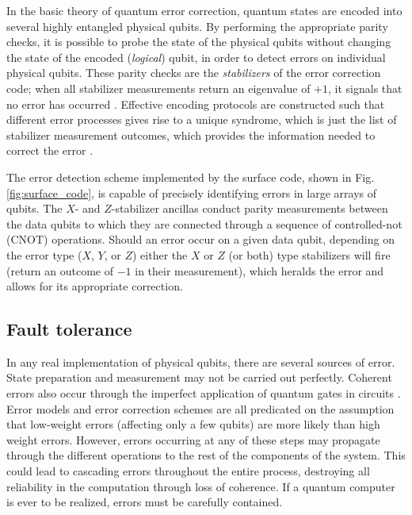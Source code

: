 In the basic theory of quantum error correction, quantum states are encoded into
several highly entangled physical qubits. By performing the appropriate parity
checks, it is possible to probe the state of the physical qubits without
changing the state of the encoded (\textit{logical}) qubit, in order to detect
errors on individual physical qubits. These parity checks are the
\textit{stabilizers} of the error correction code; when all stabilizer
measurements return an eigenvalue of $+1$, it signals that no error has occurred
\cite{nielsen_chuang_2010}. Effective encoding protocols are constructed such
that different error processes gives rise to a unique syndrome, which is just the
list of stabilizer measurement outcomes, which provides the information needed
to correct the error \cite{fowler12_surfac_codes}.

The error detection scheme implemented by the surface code, shown in Fig.
\ref{fig:surface_code}, is capable of precisely identifying errors in large
arrays of qubits. The $X$- and $Z$-stabilizer ancillas conduct parity
measurements between the data qubits to which they are connected through a
sequence of controlled-not (CNOT) operations. Should an error occur on a given
data qubit, depending on the error type ($X$, $Y$, or $Z$) either the $X$ or $Z$
(or both) type stabilizers will fire (return an outcome of $-1$ in their
measurement), which heralds the error and allows for its appropriate correction.

\subsection{Fault tolerance}
In any real implementation of physical qubits, there are several sources of
error. State preparation and measurement may not be carried out perfectly.
Coherent errors also occur through the imperfect application of quantum gates in
circuits \cite{Devitt_2013}. Error models and error correction schemes are all
predicated on the assumption that low-weight errors (affecting only a few
qubits) are more likely than high weight errors. However, errors occurring at
any of these steps may propagate through the different operations to the rest of
the components of the system. This could lead to cascading errors throughout the
entire process, destroying all reliability in the computation through loss of
coherence. If a quantum computer is ever to be realized, errors must be
carefully contained.

